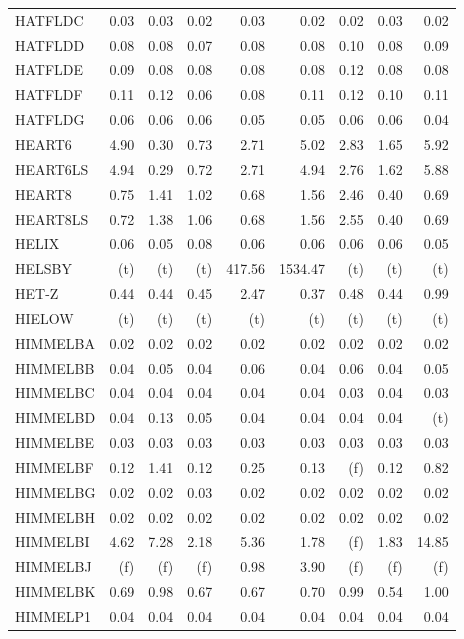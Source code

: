 \documentclass[11pt,twoside]{article}
\begin{document}
{\begin{longtable}[c]{|l|r|r|r|r|r|r|r|r|}
HATFLDC & 0.03 & 0.03 & 0.02 & 0.03 & 0.02 & 0.02 & 0.03 & 0.02 \\
HATFLDD & 0.08 & 0.08 & 0.07 & 0.08 & 0.08 & 0.10 & 0.08 & 0.09 \\
HATFLDE & 0.09 & 0.08 & 0.08 & 0.08 & 0.08 & 0.12 & 0.08 & 0.08 \\
HATFLDF & 0.11 & 0.12 & 0.06 & 0.08 & 0.11 & 0.12 & 0.10 & 0.11 \\
HATFLDG & 0.06 & 0.06 & 0.06 & 0.05 & 0.05 & 0.06 & 0.06 & 0.04 \\
HEART6 & 4.90 & 0.30 & 0.73 & 2.71 & 5.02 & 2.83 & 1.65 & 5.92 \\
HEART6LS & 4.94 & 0.29 & 0.72 & 2.71 & 4.94 & 2.76 & 1.62 & 5.88 \\
HEART8 & 0.75 & 1.41 & 1.02 & 0.68 & 1.56 & 2.46 & 0.40 & 0.69 \\
HEART8LS & 0.72 & 1.38 & 1.06 & 0.68 & 1.56 & 2.55 & 0.40 & 0.69 \\
HELIX & 0.06 & 0.05 & 0.08 & 0.06 & 0.06 & 0.06 & 0.06 & 0.05 \\
HELSBY & (t) & (t) & (t) & 417.56 & 1534.47 & (t) & (t) & (t) \\
HET-Z & 0.44 & 0.44 & 0.45 & 2.47 & 0.37 & 0.48 & 0.44 & 0.99 \\
HIELOW & (t) & (t) & (t) & (t) & (t) & (t) & (t) & (t) \\
HIMMELBA & 0.02 & 0.02 & 0.02 & 0.02 & 0.02 & 0.02 & 0.02 & 0.02 \\
HIMMELBB & 0.04 & 0.05 & 0.04 & 0.06 & 0.04 & 0.06 & 0.04 & 0.05 \\
HIMMELBC & 0.04 & 0.04 & 0.04 & 0.04 & 0.04 & 0.03 & 0.04 & 0.03 \\
HIMMELBD & 0.04 & 0.13 & 0.05 & 0.04 & 0.04 & 0.04 & 0.04 & (t) \\
HIMMELBE & 0.03 & 0.03 & 0.03 & 0.03 & 0.03 & 0.03 & 0.03 & 0.03 \\
HIMMELBF & 0.12 & 1.41 & 0.12 & 0.25 & 0.13 & (f) & 0.12 & 0.82 \\
HIMMELBG & 0.02 & 0.02 & 0.03 & 0.02 & 0.02 & 0.02 & 0.02 & 0.02 \\
HIMMELBH & 0.02 & 0.02 & 0.02 & 0.02 & 0.02 & 0.02 & 0.02 & 0.02 \\
HIMMELBI & 4.62 & 7.28 & 2.18 & 5.36 & 1.78 & (f) & 1.83 & 14.85 \\
HIMMELBJ & (f) & (f) & (f) & 0.98 & 3.90 & (f) & (f) & (f) \\
HIMMELBK & 0.69 & 0.98 & 0.67 & 0.67 & 0.70 & 0.99 & 0.54 & 1.00 \\
HIMMELP1 & 0.04 & 0.04 & 0.04 & 0.04 & 0.04 & 0.04 & 0.04 & 0.04 \\

\end{longtable}}
\end{document}
